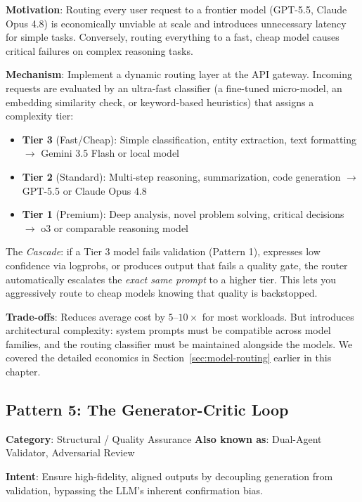\textbf{Motivation}: Routing every user request to a frontier model (GPT-5.5, Claude Opus 4.8) is economically unviable at scale and introduces unnecessary latency for simple tasks. Conversely, routing everything to a fast, cheap model causes critical failures on complex reasoning tasks.

\textbf{Mechanism}: Implement a dynamic routing layer at the API gateway. Incoming requests are evaluated by an ultra-fast classifier (a fine-tuned micro-model, an embedding similarity check, or keyword-based heuristics) that assigns a complexity tier:

\begin{itemize}[leftmargin=*]
    \item \textbf{Tier 3} (Fast/Cheap): Simple classification, entity extraction, text formatting $\to$ Gemini 3.5 Flash or local model
    \item \textbf{Tier 2} (Standard): Multi-step reasoning, summarization, code generation $\to$ GPT-5.5 or Claude Opus 4.8
    \item \textbf{Tier 1} (Premium): Deep analysis, novel problem solving, critical decisions $\to$ o3 or comparable reasoning model
\end{itemize}

The \emph{Cascade}: if a Tier 3 model fails validation (Pattern 1), expresses low confidence via logprobs, or produces output that fails a quality gate, the router automatically escalates the \emph{exact same prompt} to a higher tier. This lets you aggressively route to cheap models knowing that quality is backstopped.

\textbf{Trade-offs}: Reduces average cost by $5$--$10\times$ for most workloads. But introduces architectural complexity: system prompts must be compatible across model families, and the routing classifier must be maintained alongside the models. We covered the detailed economics in Section~\ref{sec:model-routing} earlier in this chapter.


\subsection{Pattern 5: The Generator-Critic Loop}

\textbf{Category}: Structural / Quality Assurance \hfill \textbf{Also known as}: Dual-Agent Validator, Adversarial Review

\textbf{Intent}: Ensure high-fidelity, aligned outputs by decoupling generation from validation, bypassing the LLM's inherent confirmation bias.

